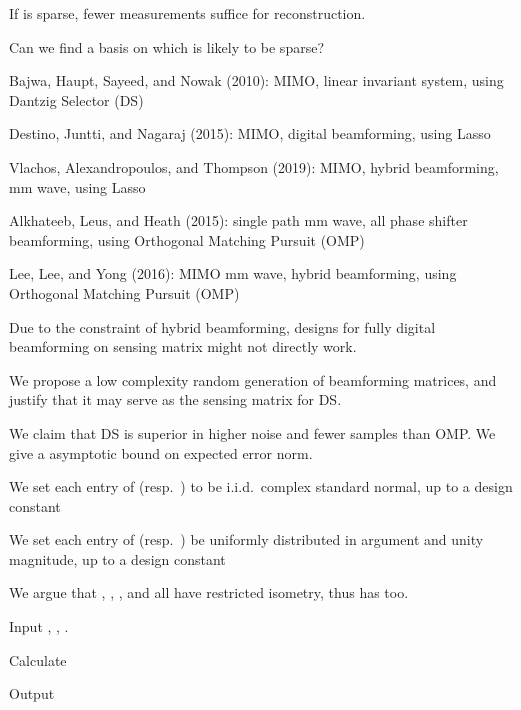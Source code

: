 {
\blank [big]

\I If  is sparse, fewer measurements suffice for reconstruction.

\I Can we find a basis on which  is likely to be sparse?
}
{
\I Bajwa, Haupt, Sayeed, and Nowak (2010): MIMO, linear invariant system, using Dantzig Selector (DS)

\I Destino, Juntti, and Nagaraj (2015): MIMO, digital beamforming, using Lasso

\I Vlachos, Alexandropoulos, and Thompson (2019): MIMO, hybrid beamforming, mm wave, using Lasso

\I Alkhateeb, Leus, and Heath (2015): single path mm wave, all phase shifter beamforming, using Orthogonal Matching Pursuit (OMP)

\I Lee, Lee, and Yong (2016): MIMO mm wave, hybrid beamforming, using Orthogonal Matching Pursuit (OMP)
}
{
\I Due to the constraint of hybrid beamforming, designs for fully digital beamforming on sensing matrix might not directly work.

\I We propose a low complexity random generation of beamforming matrices, and justify that it may serve as the sensing matrix for DS.

\I We claim that DS is superior in higher noise and fewer samples than OMP.
\I We give a asymptotic bound on expected error norm.
}
{
\I We set each entry of  (resp.\ ) to be i.i.d.\ complex standard normal, up to a design constant

\I We set each entry of  (resp.\ ) be uniformly distributed in argument and unity magnitude, up to a design constant

\I We argue that , , , and  all have restricted isometry, thus  has too.
}
{
\I Input , , .

\I Calculate

\I Output 
}


